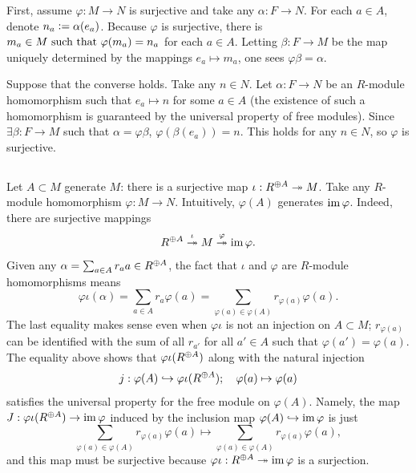 \documentclass[12pt]{article}
\begin{document}
First, assume $\varphi: M \rightarrow N$ is surjective and take any $\alpha: F \rightarrow N$. 
For each $a \in A$, denote $n_a \vcentcolon= \alpha(e_a)$. 
Because $\varphi$ is surjective, there is $m_a \in M \text{ such that } \varphi(m_a) = n_a$ for each $a \in A$. 
Letting $\beta: F \rightarrow M$ be the map uniquely determined by the mappings $e_a \mapsto m_a$, one sees $\varphi \beta = \alpha$. 

Suppose that the converse holds. 
Take any $n \in N$. 
Let $\alpha: F \rightarrow N$ be an $R$-module homomorphism such that $e_a \mapsto n$ for some $a \in A$
(the existence of such a homomorphism is guaranteed by the universal property of free modules). 
Since $\exists \beta: F \rightarrow M$ such that $\alpha = \varphi \beta$, $\varphi(\beta(e_a)) = n$.
This holds for any $n \in N$, so $\varphi$ is surjective. 

\setcounter{subsection}{12} 
\subsection{}
Let $A \subset M$ generate $M$: 
there is a surjective map $\iota: R^{\oplus A} \twoheadrightarrow M$. 
Take any $R$-module homomorphism $\varphi: M \rightarrow N$. 
Intuitively, $\varphi(A)$ generates $\operatorname{im} \varphi$. 
Indeed, there are surjective mappings 
$$R^{\oplus A} \overset{\iota}{\twoheadrightarrow} M \overset{\varphi}{\twoheadrightarrow} \operatorname{im} \varphi.$$ 
Given any $\alpha = \sum_{a \in A} r_a a \in R^{\oplus A}$, the fact that $\iota$ and $\varphi$ are $R$-module homomorphisms means 
$$\varphi \iota(\alpha) = \sum_{a \in A}r_a \varphi(a) = \sum_{\varphi(a) \in \varphi(A)} r_{\varphi(a)} \varphi(a).$$
The last equality makes sense even when $\varphi \iota$ is not an injection on $A \subset M$; 
$r_{\varphi(a)}$ can be identified with the sum of all $r_{a'}$ for all $a' \in A$ such that $\varphi(a') = \varphi(a)$. 
The equality above shows that $\varphi\iota(R^{\oplus A})$ along with the natural injection
$$j: \varphi(A) \hookrightarrow \varphi\iota(R^{\oplus A}); \quad \varphi(a) \mapsto \varphi(a)$$
satisfies the universal property for the free module on $\varphi(A)$. 
Namely, the map $J: \varphi\iota(R^{\oplus A}) \rightarrow \operatorname{im} \varphi$ induced by the inclusion map $\varphi(A) \hookrightarrow \operatorname{im} \varphi$ is just 
$$\sum_{\varphi(a) \in \varphi(A)} r_{\varphi(a)} \varphi(a) \mapsto \sum_{\varphi(a) \in \varphi(A)} r_{\varphi(a)} \varphi(a),$$
and this map must be surjective because $\varphi \iota: R^{\oplus A} \twoheadrightarrow \operatorname{im} \varphi$ is a surjection. 
\end{document}
